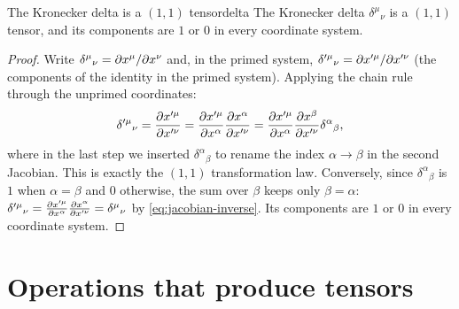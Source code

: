 \begin{proposition}{The Kronecker delta is a $(1,1)$ tensor}{delta}
The Kronecker delta $\delta^\mu{}_\nu$ is a $(1,1)$ tensor, and its components are $1$ or $0$ in every coordinate system.
\end{proposition}
\begin{proof}
Write $\delta^\mu{}_\nu=\partial x^\mu/\partial x^\nu$ and, in the primed system, $\delta'^\mu{}_\nu=\partial x'^\mu/\partial x'^\nu$ (the components of the identity in the primed system). Applying the chain rule through the unprimed coordinates:
\[
  \delta'^\mu{}_\nu=\frac{\partial x'^\mu}{\partial x'^\nu}=\frac{\partial x'^\mu}{\partial x^\alpha}\frac{\partial x^\alpha}{\partial x'^\nu}
  =\frac{\partial x'^\mu}{\partial x^\alpha}\frac{\partial x^\beta}{\partial x'^\nu}\delta^\alpha{}_\beta ,
\]
where in the last step we inserted $\delta^\alpha{}_\beta$ to rename the index $\alpha\to\beta$ in the second Jacobian. This is exactly the $(1,1)$ transformation law. Conversely, since $\delta^\alpha{}_\beta$ is $1$ when $\alpha=\beta$ and $0$ otherwise, the sum over $\beta$ keeps only $\beta=\alpha$: $\delta'^\mu{}_\nu=\frac{\partial x'^\mu}{\partial x^\alpha}\frac{\partial x^\alpha}{\partial x'^\nu}=\delta^\mu{}_\nu$ by \eqref{eq:jacobian-inverse}. Its components are $1$ or $0$ in every coordinate system.
\end{proof}

\section{Operations that produce tensors}

